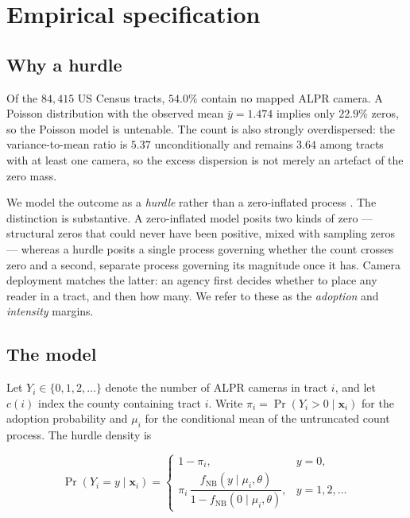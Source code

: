 
\section{Empirical specification}

\subsection{Why a hurdle}

Of the $84{,}415$ US Census tracts, $54.0\%$ contain no mapped ALPR camera. A
Poisson distribution with the observed mean $\bar{y}=1.474$ implies only
$22.9\%$ zeros, so the Poisson model is untenable. The count is also strongly
overdispersed: the variance-to-mean ratio is $5.37$ unconditionally and remains
$3.64$ among tracts with at least one camera, so the excess dispersion is not
merely an artefact of the zero mass.

We model the outcome as a \emph{hurdle} rather than a zero-inflated process
\citep{Mullahy1986}. The distinction is substantive. A zero-inflated model
posits two kinds of zero --- structural zeros that could never have been
positive, mixed with sampling zeros --- whereas a hurdle posits a single
process governing whether the count crosses zero and a second, separate process
governing its magnitude once it has. Camera deployment matches the latter: an
agency first decides whether to place any reader in a tract, and then how many.
We refer to these as the \emph{adoption} and \emph{intensity} margins.

\subsection{The model}

Let $Y_i \in \{0,1,2,\dots\}$ denote the number of ALPR cameras in tract $i$,
and let $c(i)$ index the county containing tract $i$. Write $\pi_i =
\Pr(Y_i > 0 \mid \mathbf{x}_i)$ for the adoption probability and $\mu_i$ for
the conditional mean of the untruncated count process. The hurdle density is

\begin{equation}
\Pr(Y_i = y \mid \mathbf{x}_i) =
\begin{cases}
1 - \pi_i, & y = 0,\\[6pt]
\pi_i \, \dfrac{f_{\mathrm{NB}}(y \mid \mu_i, \theta)}
               {1 - f_{\mathrm{NB}}(0 \mid \mu_i, \theta)}, & y = 1,2,\dots
\end{cases}
\label{eq:hurdle}
\end{equation}

